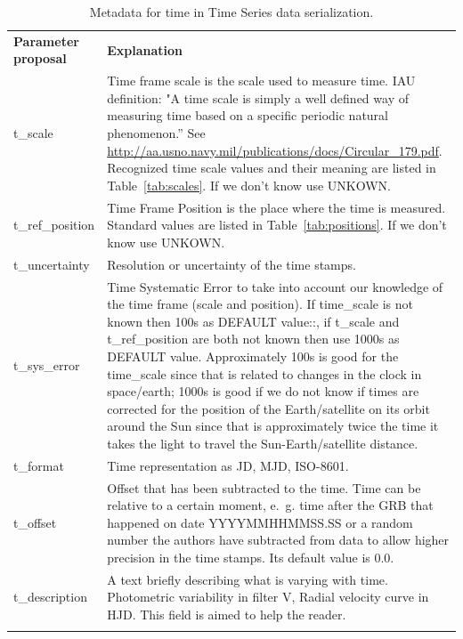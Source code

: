 \documentclass[11pt,a4paper]{ivoa}
\begin{document}
\begin{table}[!htb]
  \begin{center}
    \caption{Metadata for time in Time Series data serialization.}
    \label{tab:metadata}
      \begin{tabular}{p{}p{}}
      \sptablerule
      \textbf{Parameter proposal} & \textbf{Explanation} \\\sptablerule
      t\_scale & Time frame scale is the scale used to measure time. IAU definition: "A time scale is simply a well defined way of measuring time based on a specific periodic natural phenomenon.''  See \url{http://aa.usno.navy.mil/publications/docs/Circular_179.pdf}.
      Recognized time scale values and their meaning are listed in Table~\ref{tab:scales}. If we don't know use UNKOWN. \\
      t\_ref\_position &  Time Frame Position is the place where the time is measured. Standard values are listed in Table~\ref{tab:positions}. If we don't know use UNKOWN. \\
      t\_uncertainty & Resolution or uncertainty of the time stamps. \\
      t\_sys\_error  & Time Systematic Error to take into account our knowledge of the time frame (scale and position). If time\_scale is not known then 100s as DEFAULT value::, if t\_scale and t\_ref\_position are both not known then use  1000s as DEFAULT value. Approximately 100s is good for the time\_scale since that is related to changes in the clock in space/earth; 1000s is good if we do not know if times are corrected for the position of the Earth/satellite on its orbit around the Sun since that is approximately twice the time it takes the light to travel the Sun-Earth/satellite distance. \\
      t\_format  & Time representation as JD, MJD, ISO-8601. \\
      t\_offset &  Offset that has been subtracted to the time. Time can be relative to a certain moment, e.~g. time after the GRB that happened on date YYYYMMHHMMSS.SS or a random number the authors have subtracted from data to allow higher precision in the time stamps. Its default value is 0.0. \\
     t\_description & A text briefly describing what is varying with time. Photometric variability in filter V, Radial velocity curve in HJD. This field is aimed to help the reader. \\
    \sptablerule
    \end{tabular}
  \end{center}
\end{table}
\end{document}
